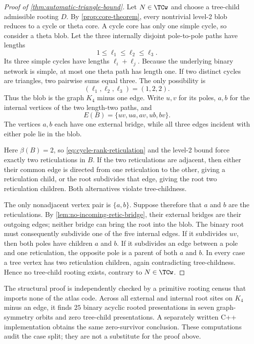 \begin{proof}[Proof of \cref{thm:automatic-triangle-bound}]
Let $N\in\TCw$ and choose a tree-child admissible rooting $D$.  By \cref{prop:core-theorem}, every nontrivial level-2 blob reduces to a cycle or theta core.  A cycle core has only one simple cycle, so consider a theta blob.  Let the three internally disjoint pole-to-pole paths have lengths
\[
1\le \ell_1\le\ell_2\le\ell_3.
\]
Its three simple cycles have lengths $\ell_i+\ell_j$.  Because the underlying binary network is simple, at most one theta path has length one.  If two distinct cycles are triangles, two pairwise sums equal three.  The only possibility is
\[
(\ell_1,\ell_2,\ell_3)=(1,2,2).
\]
Thus the blob is the graph $K_4$ minus one edge.  Write $u,v$ for its poles, $a,b$ for the internal vertices of the two length-two paths, and
\[
E(B)=\{uv,ua,av,ub,bv\}.
\]
The vertices $a,b$ each have one external bridge, while all three edges incident with either pole lie in the blob.

Here $\beta(B)=2$, so \eqref{eq:cycle-rank-reticulation} and the level-2 bound force exactly two reticulations in $B$.  If the two reticulations are adjacent, then either their common edge is directed from one reticulation to the other, giving a reticulation child, or the root subdivides that edge, giving the root two reticulation children.  Both alternatives violate tree-childness.

The only nonadjacent vertex pair is $\{a,b\}$.  Suppose therefore that $a$ and $b$ are the reticulations.  By \cref{lem:no-incoming-retic-bridge}, their external bridges are their outgoing edges; neither bridge can bring the root into the blob.  The binary root must consequently subdivide one of the five internal edges.  If it subdivides $uv$, then both poles have children $a$ and $b$.  If it subdivides an edge between a pole and one reticulation, the opposite pole is a parent of both $a$ and $b$.  In every case a tree vertex has two reticulation children, again contradicting tree-childness.  Hence no tree-child rooting exists, contrary to $N\in\TCw$.
\end{proof}



\begin{remark}\label{rem:multitriangle-replay}
The structural proof is independently checked by a primitive rooting census that imports none of the atlas code.  Across all external and internal root sites on $K_4$ minus an edge, it finds $25$ binary acyclic rooted presentations in seven graph-symmetry orbits and zero tree-child presentations.  A separately written C++ implementation obtains the same zero-survivor conclusion.  These computations audit the case split; they are not a substitute for the proof above.
\end{remark}

